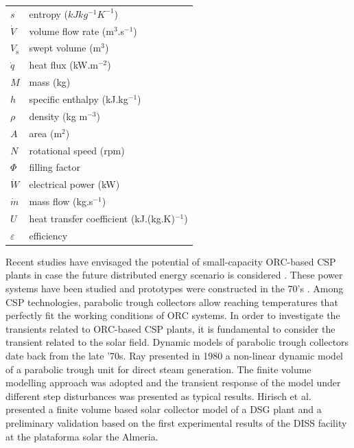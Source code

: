 \documentclass[final,3p,times,review]{elsarticle}
\begin{document}
\begin{table}[h!]
\begin{tabular}{lp{7.5cm}}
$s$ & entropy ($kJ kg^{-1} K^{-1}$)\\
$\dot{V}$ & volume flow rate (m$^3$.s$^{-1}$)\\
$V_\mathrm{s}$ & swept volume (m$^3$)\\
$\dot{q}$& heat flux (kW.m$^{-2}$) \\
$M$ & mass (kg)\\
$h$ & specific enthalpy (kJ.kg$^{-1}$)\\
$\rho$ & density (kg m$^{-3}$)\\
$A$ & area (m$^{2}$)\\
$N$ & rotational speed (rpm)\\
$\Phi$ & filling factor \\
$\dot{W}$ & electrical power (kW) \\
$\dot{m}$& mass flow (kg.s$^{-1}$) \\
$ U $& heat transfer coefficient (kJ.(kg.K)$^{-1}$) \\
$\varepsilon$ & efficiency \\
\end{tabular}
\end{table}
%
Recent studies have envisaged the potential of small-capacity ORC-based CSP plants in case the future distributed energy scenario is considered \cite{Casati2012a,Prabhu2006}. These power systems have been studied and prototypes were constructed in the 70's \cite{Verneau1978,Angelino1984Areview}. Among  CSP technologies, parabolic trough collectors allow reaching temperatures that perfectly fit the working conditions of ORC systems.  
In order to investigate the transients related to ORC-based CSP plants, it is fundamental to consider the transient related to the solar field.
Dynamic models of parabolic trough collectors date back from the late '70s. Ray \cite{Ray1981} presented in 1980 a non-linear dynamic model of a parabolic trough unit for direct steam generation. The finite volume modelling approach was adopted and the transient response of the model under different step disturbances was presented as typical results. 
Hirisch et al. \cite{Hirsch2005} presented a finite volume based solar collector model of a DSG plant and a preliminary validation based on the first experimental results of the DISS facility at the plataforma solar the Almeria. %
\end{document}
